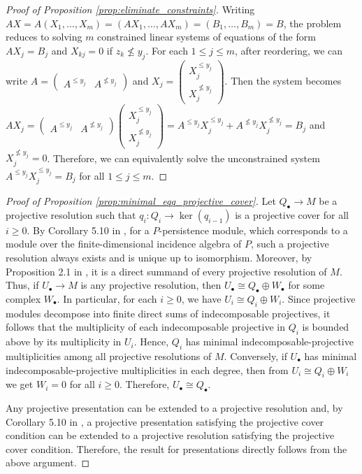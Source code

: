 \documentclass[english,a4paper,nolineno,cleveref]{socg-lipics-v2021}
\begin{document}
\begin{proof}[Proof of Proposition \ref{prop:eliminate_constraints}]
Writing $AX=A(X_1,\ldots,X_m)=(AX_1,\ldots,AX_m)=(B_1,\ldots,B_m)=B$, the problem reduces to solving $m$ constrained linear systems of equations of the form $AX_j=B_j$ and $X_{kj}=0$ if $z_k\nleq y_j$. For each $1\leq j\leq m$, after reordering, we can write $A=\begin{pmatrix}A^{\leq y_j} & A^{\nleq y_j}\end{pmatrix}$ and $X_j=\begin{pmatrix}X_j^{\leq y_j} \\ X_j^{\nleq y_j} \end{pmatrix}$. Then the system becomes $AX_j=\begin{pmatrix}A^{\leq y_j} & A^{\nleq y_j}\end{pmatrix}\begin{pmatrix}X^{\leq y_j}_j \\ X_j^{\nleq y_j} \end{pmatrix}=A^{\leq y_j}X^{\leq y_j}_j+A^{\nleq y_j}X_j^{\nleq y_j}=B_j$ and $X_j^{\nleq y_j}=0$. Therefore, we can equivalently solve the unconstrained system $A^{\leq y_j}X^{\leq y_j}_j=B_j$ for all $1\leq j\leq m$.   
\end{proof}

\begin{proof}[Proof of Proposition \ref{prop:minimal_eqq_projective_cover}]
Let $Q_\bullet \rightarrow M$ be a projective resolution such that $q_i \colon Q_i \rightarrow \ker(q_{i\minus 1})$ is a projective cover for all $i\geq 0$. By Corollary 5.10 in \cite{assem2006elements}, for a $P$-persistence module, which corresponds to a module over the finite-dimensional incidence algebra of $P$, such a projective resolution always exists and is unique up to isomorphism. Moreover, by Proposition 2.1 in \cite{nickel2010noncommutative}, it is a direct summand of every projective resolution of $M$. Thus, if $U_\bullet \rightarrow M$ is any projective resolution, then $U_\bullet \cong Q_\bullet \oplus W_\bullet$ for some complex $W_\bullet$. In particular, for each $i \geq 0$, we have $U_i \cong Q_i \oplus W_i$. Since projective modules decompose into finite direct sums of indecomposable projectives, it follows that the multiplicity of each indecomposable projective in $Q_i$ is bounded above by its multiplicity in $U_i$. Hence, $Q_i$ has minimal indecomposable-projective multiplicities among all projective resolutions of $M$. Conversely, if $U_\bullet$ has minimal indecomposable-projective multiplicities in each degree, then from $U_i \cong Q_i \oplus W_i$ we get $W_i = 0$ for all $i \geq 0$. Therefore, $U_\bullet \cong Q_\bullet$.

Any projective presentation can be extended to a projective resolution and, by Corollary 5.10 in \cite{assem2006elements}, a projective presentation satisfying the projective cover condition can be extended to a projective resolution satisfying the projective cover condition. Therefore, the result for presentations directly follows from the above argument.
\end{proof}
\end{document}
